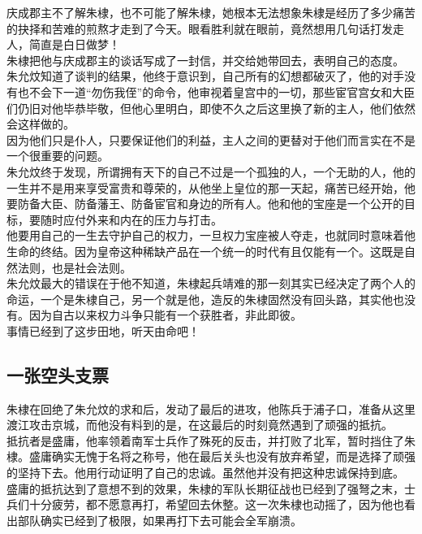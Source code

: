 \begin{multicols}{\theparacolNo}
庆成郡主不了解朱棣，也不可能了解朱棣，她根本无法想象朱棣是经历了多少痛苦的抉择和苦难的煎熬才走到了今天。眼看胜利就在眼前，竟然想用几句话打发走人，简直是白日做梦！\\

朱棣把他与庆成郡主的谈话写成了一封信，并交给她带回去，表明自己的态度。\\

朱允炆知道了谈判的结果，他终于意识到，自己所有的幻想都破灭了，他的对手没有也不会下一道“勿伤我侄”的命令，他审视着皇宫中的一切，那些宦官宫女和大臣们仍旧对他毕恭毕敬，但他心里明白，即使不久之后这里换了新的主人，他们依然会这样做的。\\

因为他们只是仆人，只要保证他们的利益，主人之间的更替对于他们而言实在不是一个很重要的问题。\\

朱允炆终于发现，所谓拥有天下的自己不过是一个孤独的人，一个无助的人，他的一生并不是用来享受富贵和尊荣的，从他坐上皇位的那一天起，痛苦已经开始，他要防备大臣、防备藩王、防备宦官和身边的所有人。他和他的宝座是一个公开的目标，要随时应付外来和内在的压力与打击。\\

他要用自己的一生去守护自己的权力，一旦权力宝座被人夺走，也就同时意味着他生命的终结。因为皇帝这种稀缺产品在一个统一的时代有且仅能有一个。这既是自然法则，也是社会法则。\\

朱允炆最大的错误在于他不知道，朱棣起兵靖难的那一刻其实已经决定了两个人的命运，一个是朱棣自己，另一个就是他，造反的朱棣固然没有回头路，其实他也没有。因为自古以来权力斗争只能有一个获胜者，非此即彼。\\

事情已经到了这步田地，听天由命吧！\\

\subsection{一张空头支票}
朱棣在回绝了朱允炆的求和后，发动了最后的进攻，他陈兵于浦子口，准备从这里渡江攻击京城，而他没有料到的是，在这最后的时刻竟然遇到了顽强的抵抗。\\

抵抗者是盛庸，他率领着南军士兵作了殊死的反击，并打败了北军，暂时挡住了朱棣。盛庸确实无愧于名将之称号，他在最后关头也没有放弃希望，而是选择了顽强的坚持下去。他用行动证明了自己的忠诚。虽然他并没有把这种忠诚保持到底。\\

盛庸的抵抗达到了意想不到的效果，朱棣的军队长期征战也已经到了强弩之末，士兵们十分疲劳，都不愿意再打，希望回去休整。这一次朱棣也动摇了，因为他也看出部队确实已经到了极限，如果再打下去可能会全军崩溃。\\


\end{multicols}
